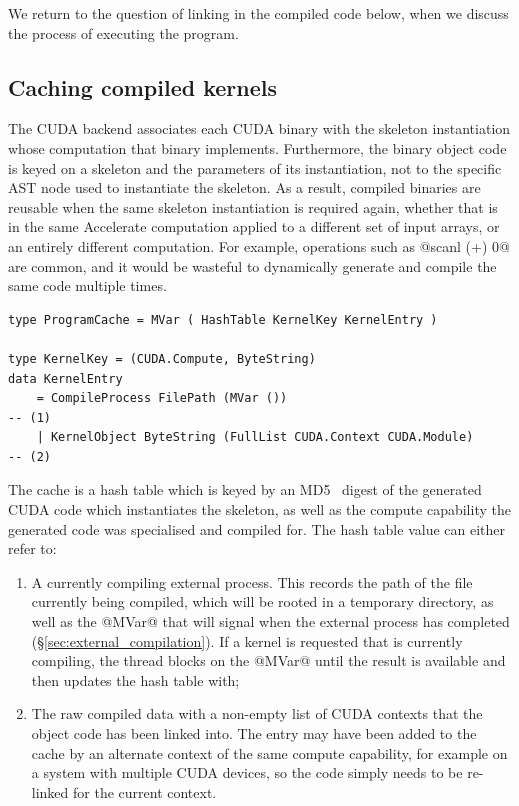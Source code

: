 We return to the question of linking in the compiled code below, when we discuss
the process of executing the program.


\subsection{Caching compiled kernels}
\label{sec:caching_compiled_kernels}

The CUDA backend associates each CUDA binary with the skeleton instantiation
whose computation that binary implements. Furthermore, the binary object code is
keyed on a skeleton and the parameters of its instantiation, not to the specific
AST node used to instantiate the skeleton. As a result, compiled binaries are
reusable when the same skeleton instantiation is required again, whether that is
in the same Accelerate computation applied to a different set of input arrays,
or an entirely different computation. For example, operations such as
@scanl (+) 0@ are common, and it would be wasteful to dynamically generate
and compile the same code multiple times.

\begin{lstlisting}[style=haskell,numbers=none]
type ProgramCache = MVar ( HashTable KernelKey KernelEntry )

type KernelKey = (CUDA.Compute, ByteString)
data KernelEntry
    = CompileProcess FilePath (MVar ())                                             -- (1)
    | KernelObject ByteString (FullList CUDA.Context CUDA.Module)                   -- (2)
\end{lstlisting}

The cache is a hash table which is keyed by an MD5~\cite{Rivest:1992va} digest
of the generated CUDA code which instantiates the skeleton, as well as the
compute capability the generated code was specialised and compiled for. The hash
table value can either refer to:
%
\begin{enumerate}
\item A currently compiling external process. This records the path of the file
    currently being compiled, which will be rooted in a temporary directory, as
    well as the @MVar@ that will signal when the external process has
    completed (\S\ref{sec:external_compilation}). If a kernel is requested that
    is currently compiling, the thread blocks on the @MVar@ until the
    result is available and then updates the hash table with;

\item The raw compiled data with a non-empty list of CUDA contexts that the
    object code has been linked into. The entry may have been added to the cache
    by an alternate context of the same compute capability, for example on a
    system with multiple CUDA devices, so the code simply needs to be
    re-linked for the current context.
\end{enumerate}

